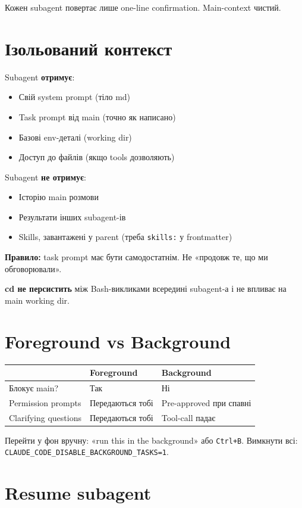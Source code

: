 \documentclass[11pt,a4paper]{article}
\begin{document}
Кожен subagent повертає лише one-line confirmation. Main-context чистий.

\section{Ізольований контекст}

Subagent \textbf{отримує}:
\begin{itemize}
  \item Свій system prompt (тіло md)
  \item Task prompt від main (точно як написано)
  \item Базові env-деталі (working dir)
  \item Доступ до файлів (якщо tools дозволяють)
\end{itemize}

Subagent \textbf{не отримує}:
\begin{itemize}
  \item Історію main розмови
  \item Результати інших subagent-ів
  \item Skills, завантажені у parent (треба \texttt{skills:} у frontmatter)
\end{itemize}

\textbf{Правило:} task prompt має бути самодостатнім. Не «продовж те, що ми обговорювали».

\textbf{cd не персистить} між Bash-викликами всередині subagent-а і не впливає на main working dir.

\section{Foreground vs Background}

\begin{tabular}{lll}
\hline
& \textbf{Foreground} & \textbf{Background} \\
\hline
Блокує main? & Так & Ні \\
Permission prompts & Передаються тобі & Pre-approved при спавні \\
Clarifying questions & Передаються тобі & Tool-call падає \\
\hline
\end{tabular}

Перейти у фон вручну: «run this in the background» або \texttt{Ctrl+B}. Вимкнути всі: \texttt{CLAUDE\_CODE\_DISABLE\_BACKGROUND\_TASKS=1}.

\section{Resume subagent}
\end{document}
